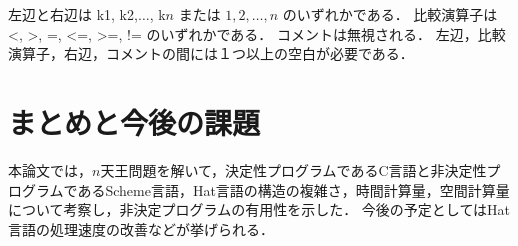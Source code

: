 \documentclass[10pt,a4j,twocolumn,oneside]{jsarticle}
\begin{document}

左辺と右辺は k1, k2,$\ldots$, k$n$ または $1, 2,\ldots, n$ のいずれかである．
比較演算子は <, >, =, <=, >=, != のいずれかである．
コメントは無視される．
左辺，比較演算子，右辺，コメントの間には１つ以上の空白が必要である．

\section{まとめと今後の課題}

本論文では，$n$天王問題を解いて，決定性プログラムであるC言語と非決定性プログラムであるScheme言語，Hat言語の構造の複雑さ，時間計算量，空間計算量について考察し，非決定プログラムの有用性を示した．
今後の予定としてはHat言語の処理速度の改善などが挙げられる．

% 
% 

% 
% 
\small

\end{document}
